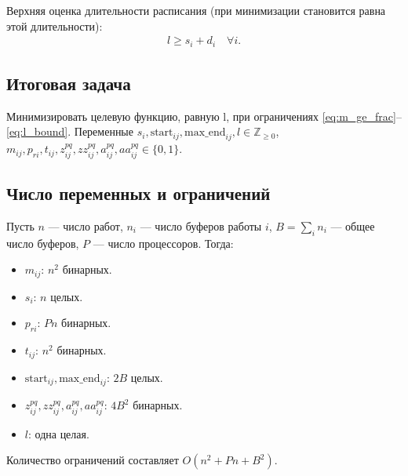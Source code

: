 Верхняя оценка длительности расписания (при минимизации становится равна этой длительности):
\begin{align}
	l \ge s_i + d_i \quad \forall i. \label{eq:l_bound}
\end{align}

\subsection*{Итоговая задача}

Минимизировать целевую функцию, равную l, при ограничениях \eqref{eq:m_ge_frac}--\eqref{eq:l_bound}.  
Переменные $s_i,\text{start}_{ij},\text{max\_end}_{ij},l\in\mathbb{Z}_{\ge0}$,  
$m_{ij},p_{ri},t_{ij},z_{ij}^{pq},zz_{ij}^{pq},a_{ij}^{pq},aa_{ij}^{pq}\in\{0,1\}$.

\subsection*{Число переменных и ограничений}

Пусть $n$ — число работ, $n_i$ — число буферов работы $i$, $B=\sum_i n_i$ — общее число буферов, $P$ — число процессоров. Тогда:
\begin{itemize}
	\item $m_{ij}$: $n^2$ бинарных.
	\item $s_i$: $n$ целых.
	\item $p_{ri}$: $P n$ бинарных.
	\item $t_{ij}$: $n^2$ бинарных.
	\item $\text{start}_{ij},\text{max\_end}_{ij}$: $2B$ целых.
	\item $z_{ij}^{pq}, zz_{ij}^{pq}, a_{ij}^{pq}, aa_{ij}^{pq}$: $4B^2$ бинарных.
	\item $l$: одна целая.
\end{itemize}
Количество ограничений составляет $O(n^2 + P n + B^2)$.